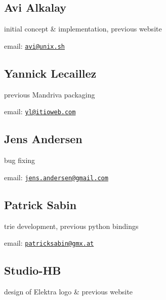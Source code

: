 \subsection*{Avi Alkalay}

initial concept \& implementation, previous website


\begin{DoxyItemize}
\item email\+: \href{mailto:avi@unix.sh}{\tt avi@unix.\+sh}
\end{DoxyItemize}

\subsection*{Yannick Lecaillez}

previous Mandriva packaging


\begin{DoxyItemize}
\item email\+: \href{mailto:yl@itioweb.com}{\tt yl@itioweb.\+com}
\end{DoxyItemize}

\subsection*{Jens Andersen}

bug fixing


\begin{DoxyItemize}
\item email\+: \href{mailto:jens.andersen@gmail.com}{\tt jens.\+andersen@gmail.\+com}
\end{DoxyItemize}

\subsection*{Patrick Sabin}

trie development, previous python bindings


\begin{DoxyItemize}
\item email\+: \href{mailto:patricksabin@gmx.at}{\tt patricksabin@gmx.\+at}
\end{DoxyItemize}

\subsection*{Studio-\/\+HB}

design of Elektra logo \& previous website


